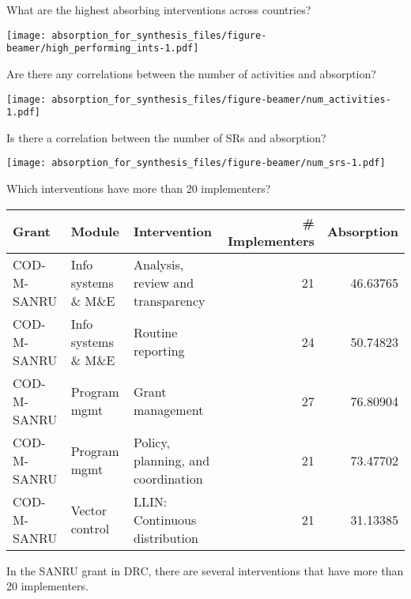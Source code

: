 \documentclass[ignorenonframetext,]{beamer}
\begin{document}
\begin{frame}{What are the highest absorbing interventions across
countries?}
\protect\hypertarget{what-are-the-highest-absorbing-interventions-across-countries}{}

\texttt{[image: absorption\_for\_synthesis\_files/figure-beamer/high\_performing\_ints-1.pdf]}

\end{frame}

\begin{frame}{Are there any correlations between the number of
activities and absorption?}
\protect\hypertarget{are-there-any-correlations-between-the-number-of-activities-and-absorption}{}

\texttt{[image: absorption\_for\_synthesis\_files/figure-beamer/num\_activities-1.pdf]}

\end{frame}

\begin{frame}{Is there a correlation between the number of SRs and
absorption?}
\protect\hypertarget{is-there-a-correlation-between-the-number-of-srs-and-absorption}{}

\texttt{[image: absorption\_for\_synthesis\_files/figure-beamer/num\_srs-1.pdf]}

\end{frame}

\begin{frame}{Which interventions have more than 20 implementers?}
\protect\hypertarget{which-interventions-have-more-than-20-implementers}{}

\begin{table}[H]
\centering\begingroup\fontsize{4}{6}\selectfont

\begin{tabular}{l|l|l|r|r}
\hline
Grant & Module & Intervention & \# Implementers & Absorption\\
\hline
COD-M-SANRU & Info systems \& M\&E & Analysis, review and transparency & 21 & 46.63765\\
\hline
COD-M-SANRU & Info systems \& M\&E & Routine reporting & 24 & 50.74823\\
\hline
COD-M-SANRU & Program mgmt & Grant management & 27 & 76.80904\\
\hline
COD-M-SANRU & Program mgmt & Policy, planning, and coordination & 21 & 73.47702\\
\hline
COD-M-SANRU & Vector control & LLIN: Continuous distribution & 21 & 31.13385\\
\hline
\end{tabular}\endgroup{}
\end{table}

In the SANRU grant in DRC, there are several interventions that have
more than 20 implementers.

\end{frame}
\end{document}
